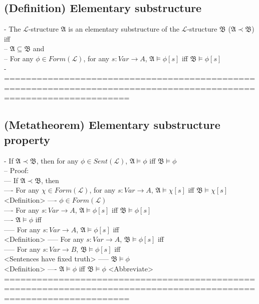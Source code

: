 \documentclass{book}
\begin{document}
\subsection{(Definition) Elementary substructure} %
	- The $\mathcal{L}$-structure $\mathfrak{A}$ is an elementary substructure of the $\mathcal{L}$-structure $\mathfrak{B}$ ($\mathfrak{A} \prec \mathfrak{B}$) iff \\
		-- $\mathfrak{A} \subseteq \mathfrak{B}$ and \\
		-- For any $\phi \in Form(\mathcal{L})$, for any $s: Var \rightarrow A$, $\mathfrak{A} \vDash \phi[s]$ iff $\mathfrak{B} \vDash \phi[s]$ \\
	- %
	===================================================================================================================
\subsection{(Metatheorem) Elementary substructure property} %
	- If $\mathfrak{A} \prec \mathfrak{B}$, then for any $\phi \in Sent(\mathcal{L})$, $\mathfrak{A} \vDash \phi$ iff $\mathfrak{B} \vDash \phi$ \\
		-- Proof: \\
			--- If $\mathfrak{A} \prec \mathfrak{B}$, then \\
				---- For any $\chi \in Form(\mathcal{L})$, for any $s: Var \rightarrow A$, $\mathfrak{A} \vDash \chi[s]$ iff $\mathfrak{B} \vDash \chi[s]$ \\ <Definition>
				---- $\phi \in Form(\mathcal{L})$ \\
				---- For any $s: Var \rightarrow A$, $\mathfrak{A} \vDash \phi[s]$ iff $\mathfrak{B} \vDash \phi[s]$ \\
				---- $\mathfrak{A} \vDash \phi$ iff \\
					----- For any $s: Var \rightarrow A$, $\mathfrak{A} \vDash \phi[s]$ iff \\ <Definition>
					----- For any $s: Var \rightarrow A$, $\mathfrak{B} \vDash \phi[s]$ iff \\
					----- For any $s: Var \rightarrow B$, $\mathfrak{B} \vDash \phi[s]$ iff \\ <Sentences have fixed truth>
					----- $\mathfrak{B} \vDash \phi$ \\ <Definition>
				---- $\mathfrak{A} \vDash \phi$ iff $\mathfrak{B} \vDash \phi$ <Abbreviate>
	===================================================================================================================
\end{document}
